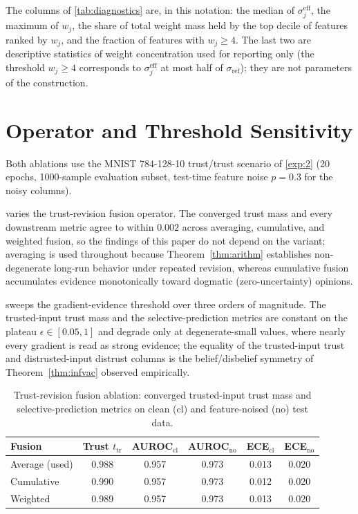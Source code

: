 The columns of \cref{tab:diagnostics} are, in this notation: the median of $\sigma^{\mathrm{eff}}_j$, the maximum of $w_j$, the share of total weight mass held by the top decile of features ranked by $w_j$, and the fraction of features with $w_j \geq 4$. The last two are descriptive statistics of weight concentration used for reporting only (the threshold $w_j \geq 4$ corresponds to $\sigma^{\mathrm{eff}}_j$ at most half of $\sigma_{\mathrm{ref}}$); they are not parameters of the construction.

\vspace{-0.5em}
\section{Operator and Threshold Sensitivity}\label{app:ablations}
Both ablations use the MNIST 784-128-10 trust/trust scenario of \cref{exp:2} (20 epochs, 1000-sample evaluation subset, test-time feature noise $p = 0.3$ for the noisy columns).

 varies the trust-revision fusion operator. The converged trust mass and every downstream metric agree to within $0.002$ across averaging, cumulative, and weighted fusion, so the findings of this paper do not depend on the variant; averaging is used throughout because Theorem~\ref{thm:arithm} establishes non-degenerate long-run behavior under repeated revision, whereas cumulative fusion accumulates evidence monotonically toward dogmatic (zero-uncertainty) opinions.

 sweeps the gradient-evidence threshold over three orders of magnitude. The trusted-input trust mass and the selective-prediction metrics are constant on the plateau $\epsilon \in [0.05, 1]$ and degrade only at degenerate-small values, where nearly every gradient is read as strong evidence; the equality of the trusted-input trust and distrusted-input distrust columns is the belief/disbelief symmetry of Theorem~\ref{thm:infvac} observed empirically.

\begin{table}[H]
\centering\footnotesize
\begin{tabular}{lccccc}
\toprule
Fusion & Trust $t_{\mathrm{tr}}$ & AUROC$_{\mathrm{cl}}$ & AUROC$_{\mathrm{no}}$ & ECE$_{\mathrm{cl}}$ & ECE$_{\mathrm{no}}$ \\
\midrule
Average (used) & 0.988 & 0.957 & 0.973 & 0.013 & 0.020 \\
Cumulative & 0.990 & 0.957 & 0.973 & 0.012 & 0.020 \\
Weighted & 0.989 & 0.957 & 0.973 & 0.013 & 0.020 \\
\bottomrule
\end{tabular}
\caption{Trust-revision fusion ablation: converged trusted-input trust mass and selective-prediction metrics on clean (cl) and feature-noised (no) test data.}
\label{tab:abl-fusion}
\end{table}

